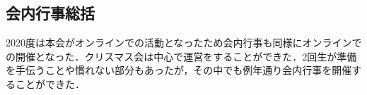\subsection*{会内行事総括}

2020度は本会がオンラインでの活動となったため会内行事も同様にオンラインでの開催となった．クリスマス会は\firstGrade{}中心で運営をすることができた．2回生が準備を手伝うことや慣れない部分もあったが，その中でも例年通り会内行事を開催することができた．
